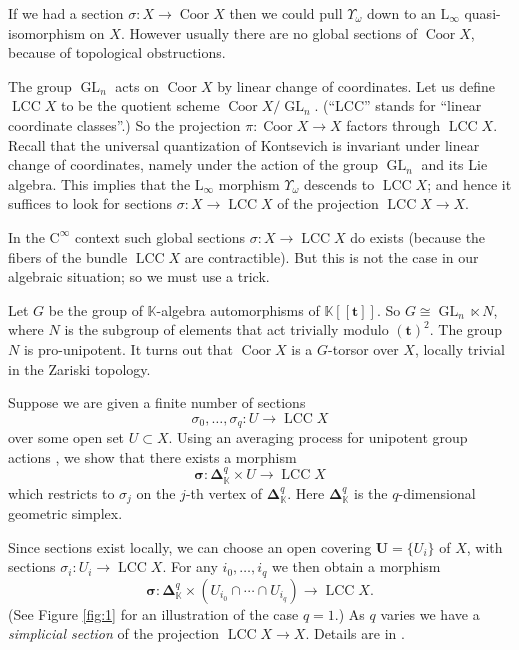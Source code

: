 \documentclass{conm-p-l}
\theoremstyle{definition}
\numberwithin{equation}{section}
\newcommand{\opn}{\operatorname}
\newcommand{\mrm}[1]{\mathrm{#1}}
\newcommand{\mbb}[1]{\mathbb{#1}}
\newcommand{\bsym}[1]{\boldsymbol{#1}}
\newcommand{\K}{\mbb{K}}
\begin{document}
If we had a section $\sigma : X \to \opn{Coor} X$
then we could pull $\Upsilon_{\omega}$ down to an $\mrm{L}_{\infty}$ 
quasi-isomorphism on $X$. 
However usually there are no global sections of $\opn{Coor} X$, because of
topological obstructions.

The group $\opn{GL}_{n}$ acts on $\opn{Coor} X$ by linear change 
of coordinates. Let us define $\opn{LCC} X$ to be the quotient scheme
$\opn{Coor} X / \opn{GL}_{n}$. (``LCC'' stands for ``linear 
coordinate classes''.) So the projection 
$\pi : \opn{Coor} X \to X$ factors through $\opn{LCC} X$.
Recall that the universal 
quantization of Kontsevich is invariant under linear change 
of coordinates, namely under the action of the group 
$\opn{GL}_{n}$ and its Lie algebra. This implies that the $\mrm{L}_{\infty}$ 
morphism $\Upsilon_{\omega}$ descends to $\opn{LCC} X$; 
and hence it suffices to look for sections 
$\sigma : X \to \opn{LCC} X$ of the projection
$\opn{LCC} X \to X$.

In the $\mrm{C}^{\infty}$ context such global sections 
$\sigma : X \to \opn{LCC} X$ do exists (because the fibers of the 
bundle $\opn{LCC} X$ are contractible). But this is not the case 
in our algebraic situation; so we must use a trick.

Let $G$ be the group of $\K$-algebra automorphisms of 
$\K[[\bsym{t}]]$. So
$G \cong \opn{GL}_n \ltimes N$,
where $N$ is the subgroup of elements that act trivially modulo 
$(\bsym{t})^2$. The group $N$ is pro-unipotent. 
It turns out that $\opn{Coor} X$ is a $G$-torsor over $X$, locally trivial in
the Zariski topology. 

Suppose we are given a finite number of sections
\[ \sigma_0, \ldots, \sigma_q : U \to \opn{LCC} X \]
over some open set $U \subset X$. 
Using an averaging process for unipotent 
group actions \cite{Ye4}, we show that there exists a morphism 
\[ \bsym{\sigma} : \bsym{\Delta}^q_{\K} \times U  \to \opn{LCC} X \] 
which restricts to $\sigma_j$ on the $j$-th vertex of
$\bsym{\Delta}^q_{\K}$. Here $\bsym{\Delta}^q_{\K}$ is the 
$q$-dimensional geometric simplex.

Since sections exist locally, we can choose an open covering 
$\bsym{U} = \{ U_i \}$ of $X$, with sections 
$\sigma_i : U_i \to \opn{LCC} X$. For any
$i_0, \ldots, i_q$ we then obtain a morphism
\[ \bsym{\sigma} : \bsym{\Delta}^q_{\K} \times 
(U_{i_0} \cap \cdots \cap U_{i_q}) \to \opn{LCC} X . \]
(See Figure \ref{fig:1} for an illustration of the case $q = 1$.)
As $q$ varies we have a {\em simplicial section}
of the projection $\opn{LCC} X \to X$. Details are in \cite{Ye2}.
\end{document}
